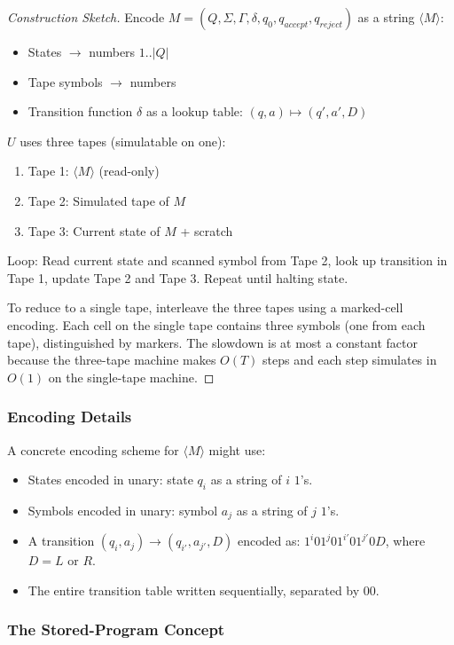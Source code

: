 \begin{proof}[Construction Sketch]
Encode $M = (Q, \Sigma, \Gamma, \delta, q_0, q_{accept}, q_{reject})$ as a string $\langle M \rangle$:
\begin{itemize}
\item States $\to$ numbers $1..|Q|$
\item Tape symbols $\to$ numbers
\item Transition function $\delta$ as a lookup table: $(q, a) \mapsto (q', a', D)$
\end{itemize}
$U$ uses three tapes (simulatable on one):
\begin{enumerate}
\item Tape 1: $\langle M \rangle$ (read-only)
\item Tape 2: Simulated tape of $M$
\item Tape 3: Current state of $M$ + scratch
\end{enumerate}
Loop: Read current state and scanned symbol from Tape 2, look up transition in Tape 1, update Tape 2 and Tape 3. Repeat until halting state.

To reduce to a single tape, interleave the three tapes using a marked-cell encoding. Each cell on the single tape contains three symbols (one from each tape), distinguished by markers. The slowdown is at most a constant factor because the three-tape machine makes $O(T)$ steps and each step simulates in $O(1)$ on the single-tape machine.
\end{proof}

\subsubsection*{Encoding Details}

A concrete encoding scheme for $\langle M \rangle$ might use:
\begin{itemize}
\item States encoded in unary: state $q_i$ as a string of $i$ $1$'s.
\item Symbols encoded in unary: symbol $a_j$ as a string of $j$ $1$'s.
\item A transition $(q_i, a_j) \to (q_{i'}, a_{j'}, D)$ encoded as: $1^{i}01^{j}01^{i'}01^{j'}0D$, where $D = L$ or $R$.
\item The entire transition table written sequentially, separated by $00$.
\end{itemize}

\subsubsection*{The Stored-Program Concept}

